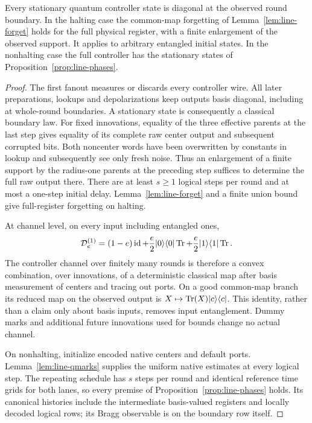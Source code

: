 \begin{lemma}\label{lem:line-physical}
Every stationary quantum controller state is diagonal at the observed
round boundary. In the halting case the common-map forgetting of
Lemma~\ref{lem:line-forget} holds for the full physical register,
with a finite enlargement of the observed support. It applies to
arbitrary entangled initial states. In the nonhalting case the full
controller has the stationary states of Proposition~\ref{prop:line-phases}.
\end{lemma}
\begin{proof}
The first fanout measures or discards every controller wire.
All later preparations, lookups and depolarizations keep outputs
basis diagonal, including at whole-round boundaries. A stationary
state is consequently a classical boundary law. For fixed innovations,
equality of the three effective parents at the last step gives equality
of its complete raw center output and subsequent corrupted bits.
Both noncenter words have been overwritten by constants in lookup
and subsequently see only fresh noise. Thus an enlargement of a
finite support by the radius-one parents at the preceding step
suffices to determine the full raw output there. There are at least
$s\ge1$ logical steps per round and at most a one-step initial delay.
Lemma~\ref{lem:line-forget} and a finite union bound give full-register
forgetting on halting.

At channel level, on every input including entangled ones,
\[
 \mathcal D^{(1)}_e=(1-e)\operatorname{id}
    +\frac e2|0\rangle\langle0|\operatorname{Tr}
    +\frac e2|1\rangle\langle1|\operatorname{Tr}.
\]
The controller channel over finitely many rounds is therefore a
convex combination, over innovations, of a deterministic classical
map after basis measurement of centers and tracing out ports.
On a good common-map branch its reduced map on the observed output
is $X\mapsto\operatorname{Tr}(X)|c\rangle\langle c|$. This identity, rather than
a claim only about basis inputs, removes input entanglement.
Dummy marks and additional future innovations used for bounds
change no actual channel.

On nonhalting, initialize encoded native centers and default ports.
Lemma~\ref{lem:line-qmarks} supplies the uniform native estimates at
every logical step. The repeating schedule has $s$ steps per round
and identical reference time grids for both lanes, so every premise
of Proposition~\ref{prop:line-phases} holds. Its canonical histories
include the intermediate basis-valued registers and locally decoded
logical rows; its Bragg observable is on the boundary row itself.
\end{proof}

